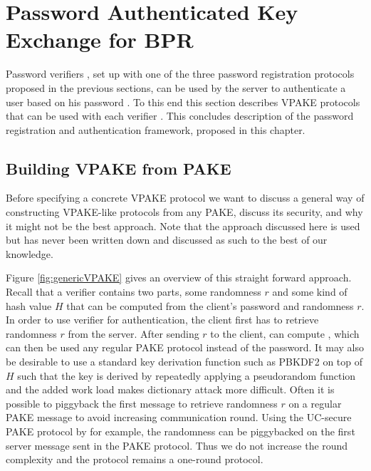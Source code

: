 \section{Password Authenticated Key Exchange for BPR}\label{sec:pake}

Password verifiers \ver, set up with one of the three password registration protocols proposed in the previous sections, can be used by the server to authenticate a user based on his password \pwd.
To this end this section describes \ac{VPAKE} protocols that can be used with each verifier \ver.
This concludes description of the password registration and authentication framework, proposed in this chapter.


\subsection{Building VPAKE from PAKE} \label{sec:vpakeToPake}
Before specifying a concrete \ac{VPAKE} protocol we want to discuss a general way of constructing \ac{VPAKE}-like protocols from any \ac{PAKE}, discuss its security, and why it might not be the best approach.
Note that the approach discussed here is used but has never been written down and discussed as such to the best of our knowledge.

Figure \ref{fig:genericVPAKE} gives an overview of this straight forward approach.
Recall that a verifier \ver contains two parts, some randomness $r$ and some kind of hash value $H$ that can be computed from the client's password \pwd and randomness $r$.
In order to use verifier \ver for authentication, the client first has to retrieve randomness $r$ from the server.
After sending $r$ to the client, \Client can compute \ver, which can then be used any regular \ac{PAKE} protocol instead of the password.
It may also be desirable to use a standard key derivation function such as PBKDF2 \cite{rfc2898} on top of $H$ such that the key is derived by repeatedly applying a pseudorandom function and the added work load makes dictionary attack more difficult.
Often it is possible to piggyback the first message to retrieve randomness $r$ on a regular \ac{PAKE} message to avoid increasing communication round. 
Using the UC-secure \ac{PAKE} protocol by \citet{Benhamouda2013} for example, the randomness can be piggybacked on the first server message sent in the \ac{PAKE} protocol. 
Thus we do not increase the round complexity and the protocol remains a one-round protocol.

